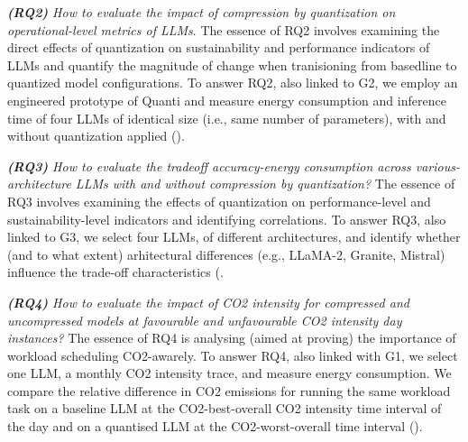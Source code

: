\textit{\textbf{(RQ2)} How to evaluate the impact of compression by quantization on operational-level metrics of LLMs}. The essence of RQ2 involves examining the direct effects of quantization on sustainability and performance indicators of LLMs and quantify the magnitude of change when tranisioning from basedline to quantized model configurations. To answer RQ2, also linked to G2, we employ an engineered prototype of Quanti and measure energy consumption and inference time of four LLMs of identical size (i.e., same number of parameters), with and without quantization applied ().

\textit{\textbf{(RQ3)} How to evaluate the tradeoff accuracy-energy consumption across various-architecture LLMs with and without compression by quantization?} The essence of RQ3 involves examining the effects of quantization on performance-level and sustainability-level indicators and identifying correlations. To answer RQ3, also linked to G3, we select four LLMs, of different architectures, and identify whether (and to what extent) arhitectural differences (e.g., LLaMA-2, Granite, Mistral) influence the trade-off characteristics (.

\textit{\textbf{(RQ4)} How to evaluate the impact of CO2 intensity for compressed and uncompressed models at favourable and unfavourable CO2 intensity day instances?} The essence of RQ4 is analysing (aimed at proving) the importance of workload scheduling CO2-awarely. To answer RQ4, also linked with G1, we select one LLM, a monthly CO2 intensity trace, and measure energy consumption. We compare the relative difference in CO2 emissions for running the same workload task on a baseline LLM at the CO2-best-overall CO2 intensity time interval of the day and on a quantised LLM at the CO2-worst-overall time interval ().



